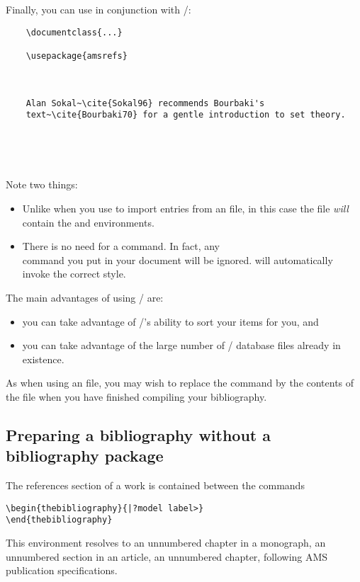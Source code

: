 Finally, you can use  in conjunction with \bibtex/:
\begin{verbatim}
    \documentclass{...}

    \usepackage{amsrefs}

    

    Alan Sokal~\cite{Sokal96} recommends Bourbaki's
    text~\cite{Bourbaki70} for a gentle introduction to set theory.

    

    
\end{verbatim}
Note two things:
\begin{itemize}

\item
Unlike when you use  to import entries from an 
file, in this case the  file \emph{will} contain the
 and  environments.

\item
There is no need for a  command. In fact, any\\
 command you put in your document will be
ignored.  will automatically invoke the correct style.  

\end{itemize}

\goodbreak

The main advantages of using \bibtex/ are:
\begin{itemize}

\item
you can take advantage of \bibtex/'s ability to sort your items for
you, and

\item
you can take advantage of the large number of \bibtex/ database files
already in existence.

\end{itemize}

As when using an  file, you may wish to replace the
 command by the contents of the  file when
you have finished compiling your bibliography.



\subsection{Preparing a bibliography without a bibliography package}
The %
references section of a work is contained between the commands
\begin{verbatim}
\begin{thebibliography}{|?model label>}
\end{thebibliography}
\end{verbatim}
This environment resolves to
{an unnumbered chapter in a monograph,}
{an unnumbered section in an article,}
{an unnumbered chapter,}
following AMS publication specifications.
\par

